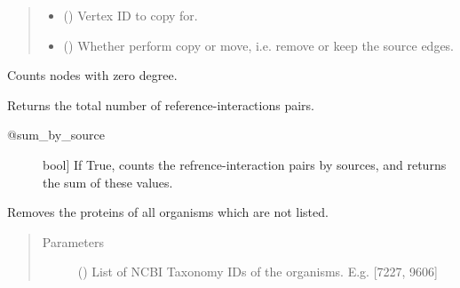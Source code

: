 \documentclass[letterpaper,10pt,english]{sphinxmanual}
\begin{document}
\begin{fulllineitems}
\begin{fulllineitems}
\begin{quote}
\begin{description}
\begin{itemize}
\item {} 
 () \textendash{} Vertex ID to copy for.

\item {} 
 () \textendash{} Whether perform copy or move, i.e. remove or keep
the source edges.

\end{itemize}

\end{description}\end{quote}

\end{fulllineitems}


\begin{fulllineitems}
\label{\detokenize{main:pypath.main.PyPath.count_sol}}
Counts nodes with zero degree.

\end{fulllineitems}


\begin{fulllineitems}
\label{\detokenize{main:pypath.main.PyPath.curation_effort}}
Returns the total number of reference-interactions pairs.
\begin{description}
\item[{@sum\_by\_source}] \leavevmode{[}bool{]}
If True, counts the refrence-interaction pairs by
sources, and returns the sum of these values.

\end{description}

\end{fulllineitems}


\begin{fulllineitems}
\label{\detokenize{main:pypath.main.PyPath.delete_by_taxon}}
Removes the proteins of all organisms which are not listed.
\begin{quote}\begin{description}
\item[{Parameters}] \leavevmode
{} () \textendash{} List of NCBI Taxonomy IDs of the organisms.
E.g. {[}7227, 9606{]}


\end{description}
\end{quote}
\end{fulllineitems}
\end{fulllineitems}
\end{document}
